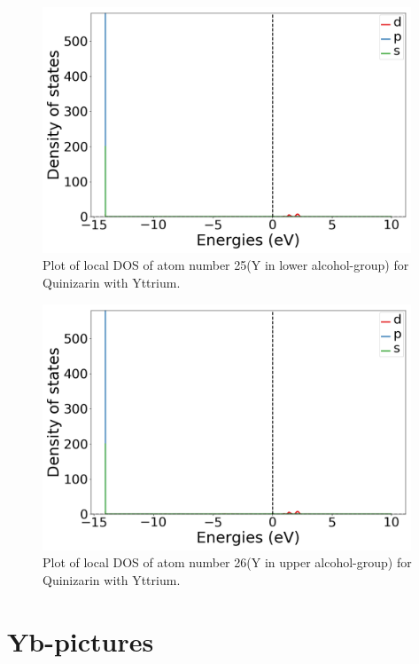 \documentclass{article}
\begin{document}
  \begin{figure}[H]
      \centering
      \includegraphics[width = 11cm]{../fig/Y_LDOS25_1.png}
      \caption{Plot of local DOS of atom number 25(Y in lower alcohol-group) for Quinizarin with Yttrium. }
      \label{fig:Y_LDOS25_1}
  \end{figure}

  \begin{figure}[H]
      \centering
      \includegraphics[width = 11cm]{../fig/Y_LDOS26_1.png}
      \caption{Plot of local DOS of atom number 26(Y in upper alcohol-group) for Quinizarin with Yttrium. }
      \label{fig:Y_LDOS26_1}
  \end{figure}

\vspace{1cm}

\section{Yb-pictures}
\end{document}
